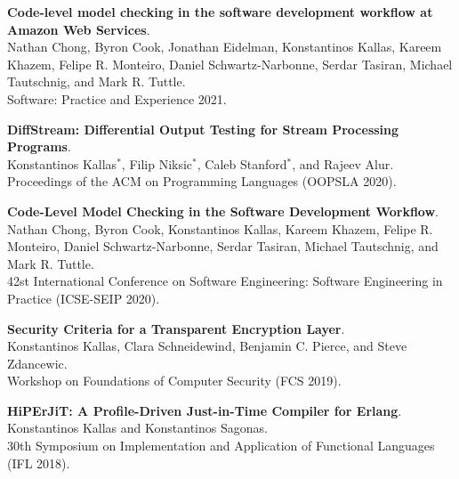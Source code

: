 \begin{minipage}{\textwidth}
\textbf{Code-level model checking in the software development workflow at Amazon Web Services}. \\
Nathan Chong, Byron Cook, Jonathan Eidelman, Konstantinos Kallas, Kareem Khazem, Felipe R. Monteiro, Daniel Schwartz-Narbonne, Serdar Tasiran, Michael Tautschnig, and Mark R. Tuttle. \\
Software: Practice and Experience 2021.
\end{minipage}

\begin{minipage}{\textwidth}
\textbf{DiffStream: Differential Output Testing for Stream Processing Programs}. \\
Konstantinos Kallas$^*$, Filip Niksic$^*$, Caleb Stanford$^*$, and Rajeev Alur. \\
Proceedings of the ACM on Programming Languages (OOPSLA 2020).
\end{minipage}

\begin{minipage}{\textwidth}
\textbf{Code-Level Model Checking in the Software Development Workflow}. \\
Nathan Chong, Byron Cook, Konstantinos Kallas, Kareem Khazem, Felipe R. Monteiro, Daniel Schwartz-Narbonne, Serdar Tasiran, Michael Tautschnig, and Mark R. Tuttle. \\
42st International Conference on Software Engineering: Software Engineering in Practice (ICSE-SEIP 2020).
\end{minipage}

\begin{minipage}{\textwidth}
\textbf{Security Criteria for a Transparent Encryption Layer}. \\
Konstantinos Kallas, Clara Schneidewind, Benjamin C. Pierce, and Steve Zdancewic. \\
Workshop on Foundations of Computer Security (FCS 2019).
\end{minipage}

\begin{minipage}{\textwidth}
\textbf{HiPErJiT: A Profile-Driven Just-in-Time Compiler for Erlang}. \\
Konstantinos Kallas and Konstantinos Sagonas. \\
30th Symposium on Implementation and Application of Functional Languages (IFL 2018).
\end{minipage}


